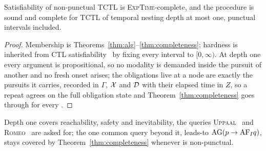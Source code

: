 \begin{corollary}\label{cor:depthone}
Satisfiability of non-punctual TCTL is \textsc{ExpTime}-complete, and the procedure is sound and
complete for TCTL of temporal nesting depth at most one, punctual intervals included.
\end{corollary}
\begin{proof}
Membership is Theorems~\ref{thm:alg}--\ref{thm:completeness}; hardness is inherited from CTL
satisfiability~\cite{Clarke99} by fixing every interval to $[0,\infty)$. At depth one every argument
is propositional, so no modality is demanded inside the pursuit of another and no fresh onset arises;
the obligations live at a node are exactly the pursuits it carries, recorded in $\Gamma$, $\mathcal{X}$ and
$\mathcal{D}$ with their elapsed time in $Z$, so a repeat agrees on the full obligation state and
Theorem~\ref{thm:completeness} goes through for every \kI.
\end{proof}

\noindent
Depth one covers reachability, safety and inevitability, the queries
\textsc{Uppaal}~\cite{BehrmannLarsenYi2004Uppaal} and \textsc{Romeo}~\cite{lime-TACAS-09} are asked
for; the one common query beyond it, leads-to $\mathrm{AG}(p\rightarrow\mathrm{AF}_I q)$, stays
covered by Theorem~\ref{thm:completeness} whenever \kI is non-punctual.

